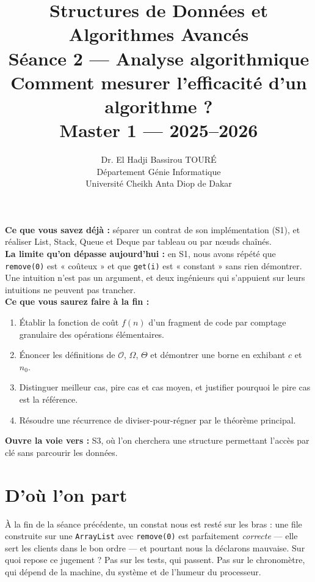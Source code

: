 \documentclass[11pt,a4paper]{article}
\title{%
\vspace{-1cm}
\textbf{\LARGE Structures de Données et}\\
\textbf{\LARGE Algorithmes Avancés}\\[0.8cm]
\textbf{\huge Séance 2 --- Analyse algorithmique}\\[0.3cm]
\textbf{\Large Comment mesurer l'efficacité d'un algorithme ?}\\[0.5cm]
\large Master 1 --- 2025--2026}
\author{Dr. El Hadji Bassirou TOURÉ\\
Département Génie Informatique\\
Université Cheikh Anta Diop de Dakar}
\date{}
\newcommand{\bigO}{\mathcal{O}}
\newcommand{\bigOmega}{\Omega}
\newcommand{\bigTheta}{\Theta}
\theoremstyle{definition}
\theoremstyle{remark}
\begin{document}
\maketitle
\thispagestyle{empty}

\begin{prereqbox}
\textbf{Ce que vous savez déjà :} séparer un contrat de son implémentation
(S1), et réaliser List, Stack, Queue et Deque par tableau ou par nœuds
chaînés.\\[4pt]
\textbf{La limite qu'on dépasse aujourd'hui :} en S1, nous avons répété que
\texttt{remove(0)} est « coûteux » et que \texttt{get(i)} est « constant »
sans rien démontrer. Une intuition n'est pas un argument, et deux ingénieurs
qui s'appuient sur leurs intuitions ne peuvent pas trancher.\\[4pt]
\textbf{Ce que vous saurez faire à la fin :}
\begin{enumerate}[nosep]
    \item Établir la fonction de coût $f(n)$ d'un fragment de code par
          comptage granulaire des opérations élémentaires.
    \item Énoncer les définitions de $\bigO$, $\bigOmega$, $\bigTheta$ et
          démontrer une borne en exhibant $c$ et $n_0$.
    \item Distinguer meilleur cas, pire cas et cas moyen, et justifier
          pourquoi le pire cas est la référence.
    \item Résoudre une récurrence de diviser-pour-régner par le théorème
          principal.
\end{enumerate}
\textbf{Ouvre la voie vers :} S3, où l'on cherchera une structure permettant
l'accès par clé sans parcourir les données.
\end{prereqbox}

\tableofcontents
\newpage

\section{D'où l'on part}

À la fin de la séance précédente, un constat nous est resté sur les bras :
une file construite sur une \texttt{ArrayList} avec \texttt{remove(0)} est
parfaitement \emph{correcte} --- elle sert les clients dans le bon ordre ---
et pourtant nous la déclarons mauvaise. Sur quoi repose ce jugement ? Pas sur
les tests, qui passent. Pas sur le chronomètre, qui dépend de la machine, du
système et de l'humeur du processeur.
\end{document}
